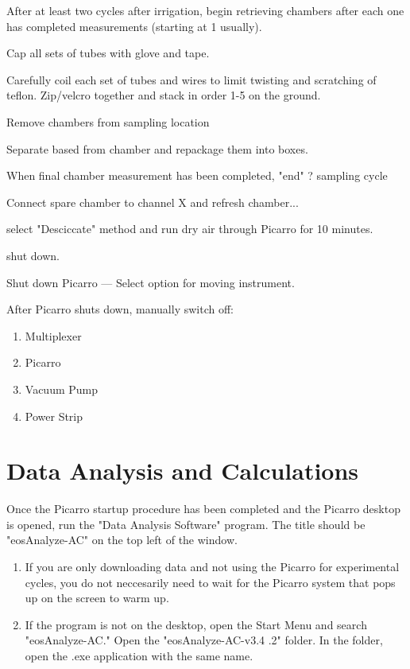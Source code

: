 \documentclass[12pt]{../SOP3}\usepackage[]{graphicx}\usepackage[]{color}
\begin{document}
\NP After at least two cycles after irrigation, begin retrieving chambers after each one has completed measurements (starting at 1 usually).
                               
\NP Cap all sets of tubes with glove and tape.
                               
\NP Carefully coil each set of tubes and wires to limit twisting and scratching of teflon. Zip/velcro together and stack in order 1-5 on the ground. 
                               
\NP Remove chambers from sampling location
                               
\NP Separate based from chamber and repackage them into boxes.
                               
\NP When final chamber measurement has been completed, "end" ? sampling cycle
                               
\NP Connect spare chamber to channel X and refresh chamber... 
                               
\NP select "Desciccate" method and run dry air through Picarro for 10 minutes.
                               
\NP shut down.
                               
\NP Shut down Picarro --- Select option for moving instrument.
                               
\NP After Picarro shuts down, manually switch off:

\begin{enumerate}
  \item Multiplexer
  \item Picarro
  \item Vacuum Pump
  \item Power Strip
\end{enumerate}
                               
\section{Data Analysis and Calculations}

\NP Once the Picarro startup procedure has been completed and the Picarro desktop is opened, run the "Data Analysis Software" program. The title should be "eosAnalyze-AC" on the top left of the window. 

\begin{enumerate}[label=(\alph*)]
  \item If you are only downloading data and not using the Picarro for experimental cycles, you do not neccesarily need to        wait for the Picarro system that pops up on the screen to warm up. 
    \item If the program is not on the desktop, open the Start Menu and search "eosAnalyze-AC." Open the "eosAnalyze-AC-v3.4     .2" folder. In the folder, open the .exe application with the same name. 
    
\end{enumerate}
\end{document}
